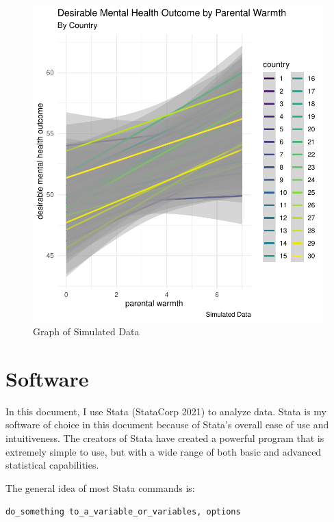 \documentclass[
  letterpaper,
  DIV=11,
  numbers=noendperiod]{scrreprt}
\begin{document}
\begin{figure}

{\centering \includegraphics{./simulated-multi-country-data_files/figure-pdf/fig-data-1.pdf}

}

\caption{\label{fig-data}Graph of Simulated Data}

\end{figure}


\hypertarget{sec-software}{%
\chapter{Software}\label{sec-software}}

In this document, I use Stata (StataCorp 2021) to analyze data. Stata is
my software of choice in this document because of Stata's overall ease
of use and intuitiveness. The creators of Stata have created a powerful
program that is extremely simple to use, but with a wide range of both
basic and advanced statistical capabilities.

The general idea of most Stata commands is:

\texttt{do\_something\ to\_a\_variable\_or\_variables,\ options}
\end{document}
